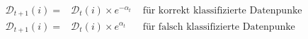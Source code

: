 \begin{align*}
    \mathcal{D}_{t+1}(i) = & \mathcal{D}_{t}(i) \times e^{-\alpha_t} & \text{ für korrekt klassifizierte Datenpunke} \\
    \mathcal{D}_{t+1}(i) = & \mathcal{D}_{t}(i) \times e^{\alpha_t}  & \text{ für falsch klassifizierte Datenpunke}
\end{align*}